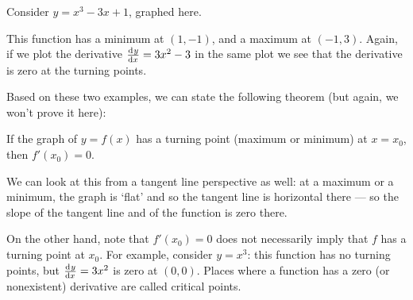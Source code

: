 \begin{ex}
  Consider $ y = x^3 - 3x + 1 $, graphed here.
  \begin{center}
  \end{center}
  This function has a minimum at $ (1, -1) $, and a maximum at $ (-1, 3) $. Again, if we plot the derivative $ \od{y}{x} = 3x^2 - 3 $
  in the same plot we see that the derivative is zero at the turning points.
  \begin{center}
  \end{center}
\end{ex}

Based on these two examples, we can state the following theorem (but again, we won't prove it here):
\begin{thm}
  If the graph of $ y = f(x) $ has a turning point (maximum or minimum) at $ x = x_0 $, then $ f'(x_0) = 0 $.
\end{thm}

We can look at this from a tangent line perspective as well: at a maximum or a minimum, the graph is `flat' and
so the tangent line is horizontal there --- so the slope of the tangent line and of the function is zero there.

On the other hand, note that $ f'(x_0) =  0 $ does not necessarily imply that $ f $ has a turning point at $ x_0 $.
For example, consider $ y = x^3 $: this function has no turning points, but $ \od{y}{x} = 3x^2 $ is zero at $ (0,0) $.
Places where a function has a zero (or nonexistent) derivative are called critical points.

